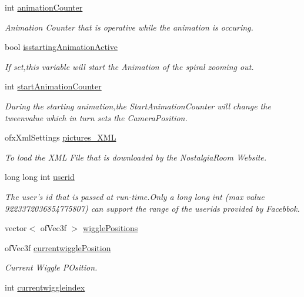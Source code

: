 \begin{DoxyCompactItemize}
int \hyperlink{classtest_app_a21b16bdba744425519597fcb925df43a}{animation\-Counter}
\begin{DoxyCompactList}\small\item\em Animation Counter that is operative while the animation is occuring. \end{DoxyCompactList}\item 
bool \hyperlink{classtest_app_ab8a277e1055730fb5d6786ce0c4804b2}{isstarting\-Animation\-Active}
\begin{DoxyCompactList}\small\item\em If set,this variable will start the Animation of the spiral zooming out. \end{DoxyCompactList}\item 
int \hyperlink{classtest_app_a577bf117cf10109de967ea0d3ca17f1f}{start\-Animation\-Counter}
\begin{DoxyCompactList}\small\item\em During the starting animation,the Start\-Animation\-Counter will change the tweenvalue which in turn sets the Camera\-Position. \end{DoxyCompactList}\item 
ofx\-Xml\-Settings \hyperlink{classtest_app_a85133f49103cfa002f39d882f7168236}{pictures\-\_\-\-X\-M\-L}
\begin{DoxyCompactList}\small\item\em To load the X\-M\-L File that is downloaded by the Nostalgia\-Room Website. \end{DoxyCompactList}\item 
long long int \hyperlink{classtest_app_a6ae76dc97fbeee00755f4a6cd6b87e19}{userid}
\begin{DoxyCompactList}\small\item\em The user's id that is passed at run-\/time.\-Only a long long int (max value 9223372036854775807) can support the range of the userids provided by Facebbok. \end{DoxyCompactList}\item 
vector$<$ of\-Vec3f $>$ \hyperlink{classtest_app_a5495d37f44bb3e3b00a04ad5910e0a6b}{wiggle\-Positions}
\item 
of\-Vec3f \hyperlink{classtest_app_af81358868ae15faab1974ec074b1509f}{currentwiggle\-Position}
\begin{DoxyCompactList}\small\item\em Current Wiggle P\-Osition. \end{DoxyCompactList}\item 
int \hyperlink{classtest_app_a6b9af0b1ae4a2c0530eb6a8cf8340751}{currentwiggleindex}

\end{DoxyCompactItemize}
